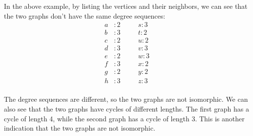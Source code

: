 \documentclass[11pt]{article}
\begin{document}
In the above example, by listing the vertices and their neighbors, we can see that the two graphs don't have the same degree sequences:
\begin{align*}
    a & : 2 & \quad & s : 3 \\
    b & : 3 & \quad & t : 2 \\
    c & : 2 & \quad & u : 2 \\
    d & : 3 & \quad & v : 3 \\
    e & : 2 & \quad & w : 3 \\
    f & : 3 & \quad & x : 2 \\
    g & : 2 & \quad & y : 2 \\
    h & : 3 & \quad & z : 3 \\
\end{align*}

The degree sequences are different, so the two graphs are not isomorphic. We can also see that the two graphs have cycles of different lengths. The first graph has a cycle of length 4, while the second graph has a cycle of length 3. This is another indication that the two graphs are not isomorphic.
\end{document}
